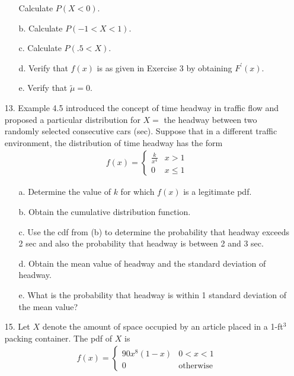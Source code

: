 \documentclass[letterpaper,12pt]{article}
\begin{document}
\begin{enumerate}
\begin{enumerate}
        Calculate $P(X < 0)$.
      \item[b.]
        Calculate $P(-1 < X < 1)$.
      \item[c.]
        Calculate $P(.5 < X)$.
      \item[d.]
        Verify that $f(x)$ is as given in Exercise 3 by obtaining $F^\prime(x)$.
      \item[e.]
        Verify that $\tilde{\mu} = 0$.
    \end{enumerate}
  \item[13.]
    Example 4.5 introduced the concept of time headway in traffic flow and proposed a particular distribution for $X =$ the headway between two randomly selected consecutive cars (sec). Suppose that in a different traffic environment, the distribution of time headway has the form
    \begin{align*}
      f(x) = \begin{cases}
        \frac{k}{x^4} & x > 1 \\
        0             & x \le 1
      \end{cases}
    \end{align*}
    \begin{enumerate}
      \item[a.]
        Determine the value of $k$ for which $f(x)$ is a legitimate pdf.
      \item[b.]
        Obtain the cumulative distribution function.
      \item[c.]
        Use the cdf from (b) to determine the probability that headway exceeds 2 sec and also the probability that headway is between 2 and 3 sec.
      \item[d.]
        Obtain the mean value of headway and the standard deviation of headway.
      \item[e.]
        What is the probability that headway is within 1 standard deviation of the mean value?
    \end{enumerate}
  \item[15.]
    Let $X$ denote the amount of space occupied by an article placed in a 1-ft$^3$ packing container. The pdf of $X$ is
    \begin{align*}
      f(x) = \begin{cases}
        90x^8(1 - x) & 0 < x < 1 \\
        0            & \text{otherwise}
      \end{cases}
    \end{align*}
    \begin{enumerate}

\end{enumerate}
\end{enumerate}
\end{document}

